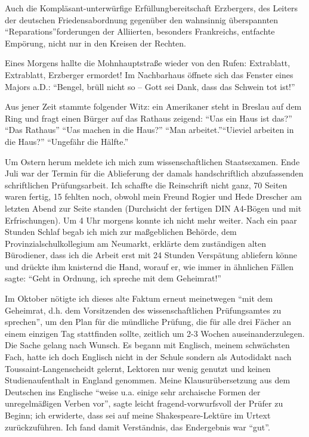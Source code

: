 \documentclass[a5paper,pagesize,10pt,twoside=true]{scrbook}
\begin{document}
Auch die Kompläsant-unterwürfige Erfüllungbereitschaft Erzbergers, des Leiters der deutschen Friedensabordnung gegenüber den wahnsinnig überspannten \enquote{Reparations}forderungen der Alliierten, besonders Frankreichs, entfachte Empörung, nicht nur in den Kreisen der Rechten.

Eines Morgens hallte die Mohnhauptstraße wieder von den Rufen: Extrablatt, Extrablatt, Erzberger ermordet! Im Nachbarhaus öffnete sich das Fenster eines Majors a.D.: \enquote{Bengel, brüll nicht so -- Gott sei Dank, dass das Schwein tot ist!}

Aus jener Zeit stammte folgender Witz: ein Amerikaner steht in Breslau auf dem Ring und fragt einen Bürger auf das Rathaus zeigend: \enquote{Uas ein Haus ist das?} \enquote{Das Rathaus} \enquote{Uas machen in die Haus?} \enquote{Man arbeitet.}\enquote{Uieviel arbeiten in die Haus?} \enquote{Ungefähr die Hälfte.}

Um Ostern herum meldete ich mich zum wissenschaftlichen Staatsexamen. Ende Juli war der Termin für die Ablieferung der damals handschriftlich abzufassenden schriftlichen Prüfungsarbeit. Ich schaffte die Reinschrift nicht ganz, 70 Seiten waren fertig, 15 fehlten noch, obwohl mein Freund Rogier und Hede Drescher am letzten Abend zur Seite standen (Durchsicht der fertigen DIN A4-Bögen und mit Erfrischungen). Um 4 Uhr morgens konnte ich nicht mehr weiter. Nach ein paar Stunden Schlaf begab ich mich zur maßgeblichen Behörde, dem Provinzialschulkollegium am Neumarkt, erklärte dem zuständigen alten Bürodiener, dass ich die Arbeit erst mit 24 Stunden Verspätung abliefern könne und drückte ihm knisternd die Hand, worauf er, wie immer in ähnlichen Fällen sagte: \enquote{Geht in Ordnung, ich spreche mit dem Geheimrat!}

Im Oktober nötigte ich dieses alte Faktum erneut meinetwegen \enquote{mit dem Geheimrat, d.h. dem Vorsitzenden des wissenschaftlichen Prüfungsamtes zu sprechen}, um den Plan für die mündliche Prüfung, die für alle drei Fächer an einem einzigen Tag stattfinden sollte, zeitlich um 2-3 Wochen auseinanderzulegen. Die Sache gelang nach Wunsch. Es begann mit Englisch, meinem schwächsten Fach, hatte ich doch Englisch nicht in der Schule sondern als Autodidakt nach Toussaint-Langenscheidt gelernt, Lektoren nur wenig genutzt und keinen Studienaufenthalt in England genommen. Meine Klausurübersetzung aus dem Deutschen ins Englische \enquote{weise u.a. einige sehr archaische Formen der unregelmäßigen Verben vor}, sagte leicht fragend-vorwurfsvoll der Prüfer zu Beginn; ich erwiderte, dass sei auf meine Shakespeare-Lektüre im Urtext zurückzuführen. Ich fand damit Verständnis, das Endergebnis war \enquote{gut}.
\end{document}
